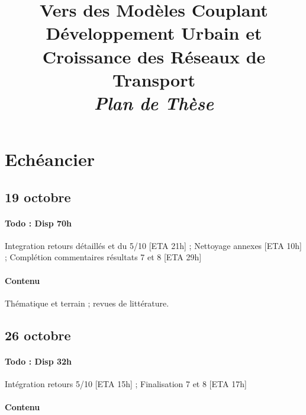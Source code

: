 




\title{Vers des Modèles Couplant Développement Urbain et Croissance des Réseaux de Transport\bigskip\\
\textit{Plan de Thèse}
}
\author{}


\maketitle

\justify


\begin{abstract}
\end{abstract}


\section*{Echéancier}


\subsection*{19 octobre}

\paragraph{Todo : Disp 70h}

Integration retours détaillés et du 5/10 [ETA 21h] ; Nettoyage annexes [ETA 10h] ; Complétion commentaires résultats 7 et 8 [ETA 29h]

\paragraph{Contenu}

Thématique et terrain ; revues de littérature.




\subsection*{26 octobre}

\paragraph{Todo : Disp 32h}

Intégration retours 5/10 [ETA 15h] ; Finalisation 7 et 8 [ETA 17h]

\paragraph{Contenu}

